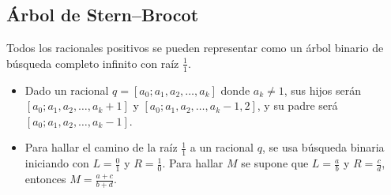 	\subsection{Árbol de Stern–Brocot}
		Todos los racionales positivos se pueden representar como un árbol binario de búsqueda completo infinito con raíz $\frac{1}{1}$.
		\begin{itemize}
			\item Dado un racional $q=[a_0;a_1,a_2,\ldots,a_k]$ donde $a_k \neq 1$, sus hijos serán $[a_0;a_1,a_2,\ldots,a_k+1]$ y $[a_0;a_1,a_2,\ldots,a_k-1,2]$, y su padre será $[a_0;a_1,a_2,\ldots,a_k-1]$.
			\item Para hallar el camino de la raíz $\frac{1}{1}$ a un racional $q$, se usa búsqueda binaria iniciando con $L=\frac{0}{1}$ y $R=\frac{1}{0}$. Para hallar $M$ se supone que $L=\frac{a}{b}$ y $R=\frac{c}{d}$, entonces $M=\frac{a+c}{b+d}$.
		\end{itemize}

